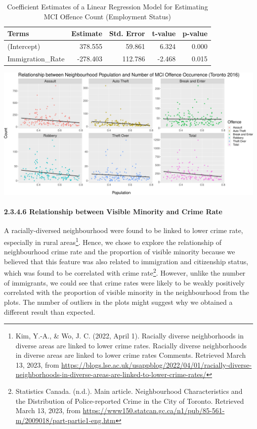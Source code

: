 \documentclass[
]{article}
\begin{document}
\begin{table}

\caption{\label{tab:crime-vs-immigration-lm}Coefficient Estimates of a Linear Regression Model for Estimating MCI Offence Count (Employment Status)}
\centering
\begin{tabular}[t]{l|r|r|r|r}
\hline
Terms & Estimate & Std. Error & t-value & p-value\\
\hline
(Intercept) & 378.555 & 59.861 & 6.324 & 0.000\\
\hline
Immigration\_Rate & -278.403 & 112.786 & -2.468 & 0.015\\
\hline
\end{tabular}
\end{table}

\includegraphics{Final-Report_files/figure-latex/crime-vs-immigration-lm-1.pdf}

\hypertarget{relationship-between-visible-minority-and-crime-rate}{%
\paragraph{2.3.4.6 Relationship between Visible Minority and Crime
Rate}\label{relationship-between-visible-minority-and-crime-rate}}

A racially-diversed neighbourhood were found to be linked to lower crime
rate, especially in rural areas\footnote{Kim, Y.-A., \& Wo, J. C. (2022,
  April 1). Racially diverse neighborhoods in diverse areas are linked
  to lower crime rates. Racially diverse neighborhoods in diverse areas
  are linked to lower crime rates Comments. Retrieved March 13, 2023,
  from
  \url{https://blogs.lse.ac.uk/usappblog/2022/04/01/racially-diverse-neighborhoods-in-diverse-areas-are-linked-to-lower-crime-rates/}}.
Hence, we chose to explore the relationship of neighbourhood crime rate
and the proportion of visible minority because we believed that this
feature was also related to immigration and citizenship status, which
was found to be correlated with crime rate\footnote{Statistics Canada.
  (n.d.). Main article. Neighbourhood Characteristics and the
  Distribution of Police-reported Crime in the City of Toronto.
  Retrieved March 13, 2023, from
  \url{https://www150.statcan.gc.ca/n1/pub/85-561-m/2009018/part-partie1-eng.htm}}.
However, unlike the number of immigrants, we could see that crime rates
were likely to be weakly positively correlated with the proportion of
visible minority in the neighbourhood from the plots. The number of
outliers in the plots might suggest why we obtained a different result
than expected.
\end{document}
